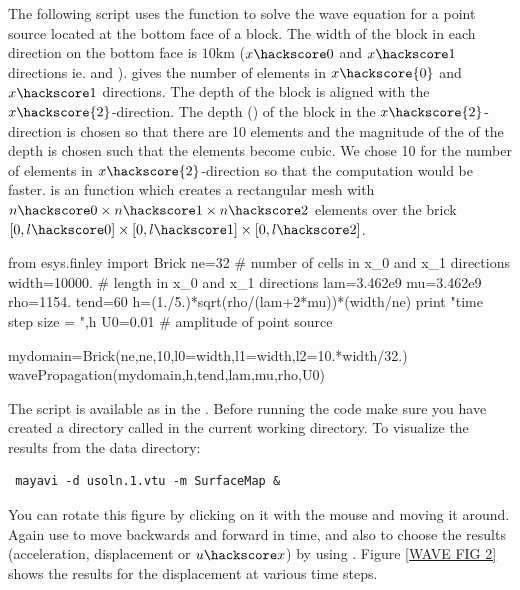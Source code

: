 The following script uses the  function to solve the
wave equation for a point source located at the bottom face of a block. The width of the block in 
each direction on the bottom face is $10\mbox{km}$ ($x\hackscore 0$ and $x\hackscore 1$ directions ie.  and ).
 gives the number of elements in $x\hackscore{0}$ and $x\hackscore 1$ directions.  
The depth of the block is aligned with the $x\hackscore{2}$-direction. 
The depth () of the block in
the $x\hackscore{2}$-direction is chosen so that there are 10 elements and the magnitude of the
of the depth is chosen such that the elements 
become cubic. We chose 10 for the number of elements in $x\hackscore{2}$-direction so that the 
computation would be faster.  is an \finley function which creates a rectangular mesh 
with $n\hackscore 0 \times n\hackscore 1 \times n\hackscore2$ elements over the brick $[0,l\hackscore 0] \times [0,l\hackscore 1] \times [0,l\hackscore 2]$.
\begin{python}
from esys.finley import Brick
ne=32          # number of cells in x_0 and x_1 directions
width=10000.  # length in x_0 and x_1 directions
lam=3.462e9
mu=3.462e9
rho=1154.
tend=60
h=(1./5.)*sqrt(rho/(lam+2*mu))*(width/ne)
print "time step size = ",h
U0=0.01 # amplitude of point source

mydomain=Brick(ne,ne,10,l0=width,l1=width,l2=10.*width/32.)
wavePropagation(mydomain,h,tend,lam,mu,rho,U0)
\end{python}
The script is available as  in the \ExampleDirectory {}. Before running the code make sure you have created a directory called  in the current
working directory.
To visualize the results from the data directory: 
\begin{verbatim} mayavi -d usoln.1.vtu -m SurfaceMap &\end{verbatim} You can rotate this figure by clicking on it with the mouse and moving it around.
Again use  to move backwards and forward in time, and 
also to choose the results (acceleration, displacement or $u\hackscore x$) by using . Figure \ref{WAVE FIG 2} shows the results for the displacement at various time steps.

